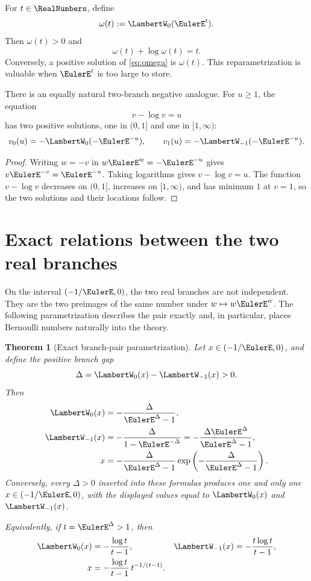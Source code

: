 \documentclass[11pt]{article}
\newtheorem{theorem}{Theorem}[section]
\theoremstyle{remark}
\newcommand{\Wz}{\LambertW_{0}}
\newcommand{\Wm}{\LambertW_{-1}}
\begin{document}
For \(t\in\RealNumbers\), define
\[
       \omega(t):=\Wz(\EulerE^t).
\]
Then \(\omega(t)>0\) and
\begin{equation}\label{eq:omega}
       \omega(t)+\log\omega(t)=t.
\end{equation}
Conversely, a positive solution of \eqref{eq:omega} is \(\omega(t)\).
This reparametrization is valuable when \(\EulerE^t\) is too large to store.

There is an equally natural two-branch negative analogue.  For \(u\geq1\),
the equation
\begin{equation}\label{eq:vminuslogv}
       v-\log v=u
\end{equation}
has two positive solutions, one in \((0,1]\) and one in \([1,\infty)\):
\[
 v_0(u)=-\Wz(-\EulerE^{-u}),\qquad
 v_1(u)=-\Wm(-\EulerE^{-u}).
\]

\begin{proof}
Writing \(w=-v\) in \(w\EulerE^w=-\EulerE^{-u}\) gives
\(v\EulerE^{-v}=\EulerE^{-u}\).  Taking logarithms gives
\(v-\log v=u\).  The function \(v-\log v\) decreases on \((0,1]\),
increases on \([1,\infty)\), and has minimum \(1\) at \(v=1\), so the two
solutions and their locations follow.
\end{proof}


\section{Exact relations between the two real branches}\label{sec:pairing}

On the interval \((-1/\EulerE,0)\), the two real branches are not independent.
They are the two preimages of the same number under \(w\mapsto w\EulerE^w\).
The following parametrization describes the pair exactly and, in particular,
places Bernoulli numbers naturally into the theory.

\begin{theorem}[Exact branch-pair parametrization]\label{thm:pairing}
Let \(x\in(-1/\EulerE,0)\), and define the positive branch gap
\begin{equation}\label{eq:branchgap}
       \Delta=\Wz(x)-\Wm(x)>0.
\end{equation}
Then
\begin{align}
 \Wz(x)&=-\frac{\Delta}{\EulerE^\Delta-1},
 \label{eq:W0-gap}\\
 \Wm(x)&=-\frac{\Delta}{1-\EulerE^{-\Delta}}
       =-\frac{\Delta\EulerE^\Delta}{\EulerE^\Delta-1},
 \label{eq:Wm-gap}\\
 x&=-\frac{\Delta}{\EulerE^\Delta-1}
       \exp\left(-\frac{\Delta}{\EulerE^\Delta-1}\right).
 \label{eq:x-gap}
\end{align}
Conversely, every \(\Delta>0\) inserted into these formulas produces one
and only one \(x\in(-1/\EulerE,0)\), with the displayed values equal to
\(\Wz(x)\) and \(\Wm(x)\).

Equivalently, if \(t=\EulerE^\Delta>1\), then
\begin{align}
 \Wz(x)&=-\frac{\log t}{t-1},&
 \Wm(x)&=-\frac{t\log t}{t-1},
 \label{eq:t-pair-W}\\
 x&=-\frac{\log t}{t-1}\,t^{-1/(t-1)}.
 \label{eq:t-pair-x}
\end{align}
\end{theorem}
\end{document}
